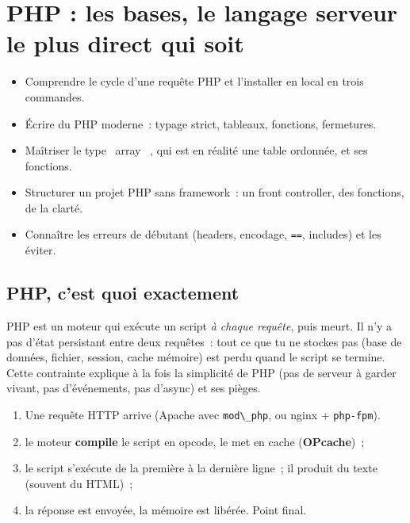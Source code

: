 \chapter{PHP : les bases, le langage serveur le plus direct qui soit}
\label{ch-php-bases}

\begin{objectif}
\begin{itemize}
  \item Comprendre le cycle d'une requ\^ete PHP et l'installer en local en trois commandes.
  \item \'Ecrire du PHP moderne~: typage strict, tableaux, fonctions, fermetures.
  \item Ma\^itriser le type \og ~array~ \fg{}, qui est en r\'ealit\'e une table ordonn\'ee, et ses fonctions.
  \item Structurer un projet PHP sans framework~: un front controller, des fonctions, de la clart\'e.
  \item Conna\^itre les erreurs de d\'ebutant (headers, encodage, \verb|==|, includes) et les \'eviter.
\end{itemize}
\end{objectif}

\section{PHP, c'est quoi exactement}

PHP est un moteur qui ex\'ecute un script \emph{\`a chaque requ\^ete}, puis meurt. Il n'y a pas d'\'etat
persistant entre deux requ\^etes~: tout ce que tu ne stockes pas (base de donn\'ees, fichier, session,
cache m\'emoire) est perdu quand le script se termine. Cette contrainte explique \`a la fois la
simplicit\'e de PHP (pas de serveur \`a garder vivant, pas d'\'ev\'enements, pas d'async) et ses pi\`eges.

\begin{enumerate}
  \item Une requ\^ete HTTP arrive (Apache avec \verb|mod\_php|, ou nginx + \verb|php-fpm|).
  \item le moteur \textbf{compile} le script en opcode, le met en cache (\textbf{OPcache})~;
  \item le script s'ex\'ecute de la premi\`ere \`a la derni\`ere ligne~; il produit du texte (souvent du HTML)~;
  \item la r\'eponse est envoy\'ee, la m\'emoire est lib\'er\'ee. Point final.
\end{enumerate}

